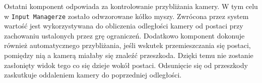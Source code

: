 Ostatni komponent odpowiada za kontrolowanie przybliżania kamery. W tym celu w \texttt{Input Managerze} zostało odwzorowane kółko
myszy. Zwrócona przez system wartość jest wykorzystywana do obliczenia odległości kamery od postaci przy zachowaniu
ustalonych przez grę ograniczeń. Dodatkowo komponent dokonuje również automatycznego przybliżania, jeśli wskutek
przemieszczania się postaci, pomiędzy nią a kamerą miałaby się znaleźć przeszkoda. Dzięki temu nie zostanie zasłonięty
widok tego co się dzieje wokół postaci. Odsunięcie się od przeszkody zaskutkuje oddaleniem kamery do poprzedniej
odległości.

